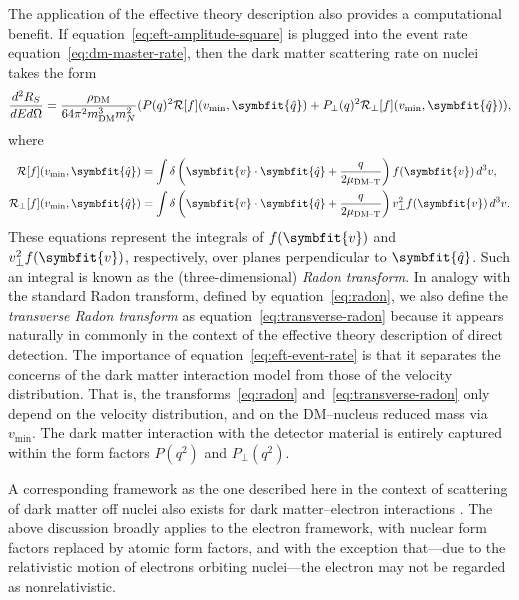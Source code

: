 \documentclass[b5paper, 10pt, twoside]{book}
\renewcommand{\vec}[1]{\symbfit{#1}}
\newcommand{\ddder}[3]{\frac{d^2#1}{d#2d#3}}
\newcommand{\unitv}[1]{\symbfit{\hat{#1}}}
\newcommand{\difd}{\,d}
\begin{document}
The application of the effective theory description also provides a computational benefit. If equation~\eqref{eq:eft-amplitude-square} is plugged into the event rate equation~\eqref{eq:dm-master-rate}, then the dark matter scattering rate on nuclei takes the form
\begin{equation}
    \ddder{R_S}{E}{\Omega}=\frac{\rho_\text{DM}}{64\pi^2m_\text{DM}^3m_N^2}(P(q)^2\mathcal{R}[f](v_\text{min},\unitv{q})+P_\perp(q)^2\mathcal{R}_\perp[f](v_\text{min},\unitv{q})),
    \label{eq:eft-event-rate}
\end{equation}
where
\begin{align}
    \label{eq:radon}
    \mathcal{R}[f](v_\text{min},\unitv{q})&=\int\delta\left(\vec{v}\cdot\unitv{q}+\frac{q}{2\mu_\text{DM--T}}\right)f(\vec{v})\difd^3v,\\
    \label{eq:transverse-radon}
    \mathcal{R}_\perp[f](v_\text{min},\unitv{q})&=\int\delta\left(\vec{v}\cdot\unitv{q}+\frac{q}{2\mu_\text{DM--T}}\right)v_\perp^2f(\vec{v})\difd^3v.
\end{align}
These equations represent the integrals of $f(\vec{v})$ and $v_\perp^2f(\vec{v})$, respectively, over planes perpendicular to $\unitv{q}$. Such an integral is known as the (three-dimensional) \emph{Radon transform}. In analogy with the standard Radon transform, defined by equation~\eqref{eq:radon}, we also define the \emph{transverse Radon transform} as equation~\eqref{eq:transverse-radon} because it appears naturally in commonly in the context of the effective theory description of direct detection. The importance of equation~\eqref{eq:eft-event-rate} is that it separates the concerns of the dark matter interaction model from those of the velocity distribution. That is, the transforms~\eqref{eq:radon} and~\eqref{eq:transverse-radon} only depend on the velocity distribution, and on the DM--nucleus reduced mass via $v_\text{min}$. The dark matter interaction with the detector material is entirely captured within the form factors $P(q^2)$ and $P_\perp(q^2)$.

A corresponding framework as the one described here in the context of scattering of dark matter off nuclei also exists for dark matter--electron interactions \parencites{CatenaEtAl2020, CatenaEtAl2021}. The above discussion broadly applies to the electron framework, with nuclear form factors replaced by atomic form factors, and with the exception that---due to the relativistic motion of electrons orbiting nuclei---the electron may not be regarded as nonrelativistic.
\end{document}
